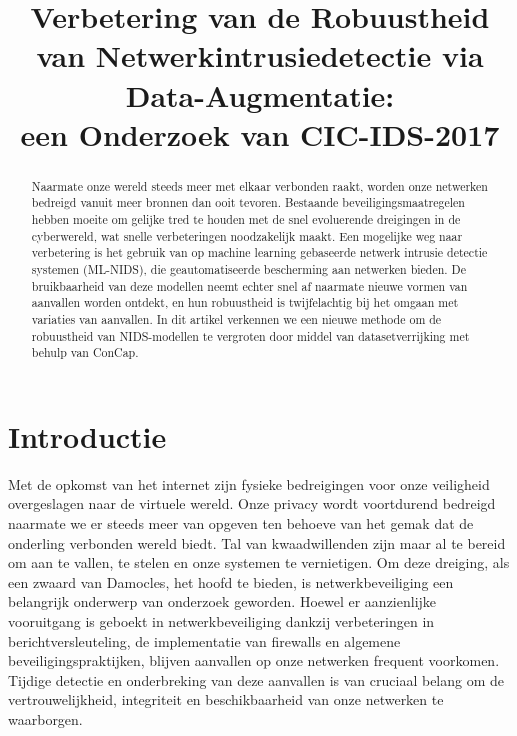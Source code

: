 \documentclass[conference]{IEEEtran}
\begin{document}
	
	\title{Verbetering van de Robuustheid van Netwerkintrusiedetectie via Data-Augmentatie:\\ een Onderzoek van CIC-IDS-2017}
		
	\author{
	}
	
	\maketitle
	\pagestyle{plain}
	
	\begin{abstract}
		Naarmate onze wereld steeds meer met elkaar verbonden raakt, worden onze netwerken bedreigd vanuit meer bronnen dan ooit tevoren. Bestaande beveiligingsmaatregelen hebben moeite om gelijke tred te houden met de snel evoluerende dreigingen in de cyberwereld, wat snelle verbeteringen noodzakelijk maakt. Een mogelijke weg naar verbetering is het gebruik van op machine learning gebaseerde netwerk intrusie detectie systemen (ML-NIDS), die geautomatiseerde bescherming aan netwerken bieden. De bruikbaarheid van deze modellen neemt echter snel af naarmate nieuwe vormen van aanvallen worden ontdekt, en hun robuustheid is twijfelachtig bij het omgaan met variaties van aanvallen. In dit artikel verkennen we een nieuwe methode om de robuustheid van NIDS-modellen te vergroten door middel van datasetverrijking met behulp van ConCap.
	\end{abstract}
	
	\section{Introductie}
	Met de opkomst van het internet zijn fysieke bedreigingen voor onze veiligheid overgeslagen naar de virtuele wereld. Onze privacy wordt voortdurend bedreigd naarmate we er steeds meer van opgeven ten behoeve van het gemak dat de onderling verbonden wereld biedt. Tal van kwaadwillenden zijn maar al te bereid om aan te vallen, te stelen en onze systemen te vernietigen. Om deze dreiging, als een zwaard van Damocles, het hoofd te bieden, is netwerkbeveiliging een belangrijk onderwerp van onderzoek geworden. Hoewel er aanzienlijke vooruitgang is geboekt in netwerkbeveiliging dankzij verbeteringen in berichtversleuteling, de implementatie van firewalls en algemene beveiligingspraktijken, blijven aanvallen op onze netwerken frequent voorkomen. Tijdige detectie en onderbreking van deze aanvallen is van cruciaal belang om de vertrouwelijkheid, integriteit en beschikbaarheid van onze netwerken te waarborgen.
	
\end{document}
